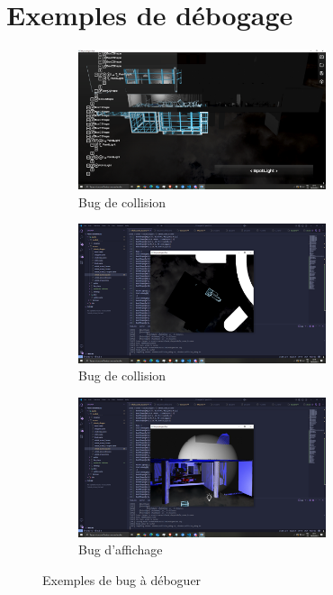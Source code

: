 \documentclass[10pt]{article}
\begin{document}
\section*{Exemples de débogage}

\begin{figure}[H]
    \begin{subfigure}{0.5\textwidth}
        \centering
        \includegraphics[width=0.8\textwidth]{images/gdb_editeur.png}
        \caption{Bug de collision}
        \label{fig:editeur1}
    \end{subfigure}
    \begin{subfigure}{0.5\textwidth}
        \centering
        \includegraphics[width=0.8\textwidth]{images/gdb_editeur2.png}
        \caption{Bug de collision}
        \label{fig:editeur2}
    \end{subfigure}
    \begin{subfigure}{0.5\textwidth}
        \centering
        \includegraphics[width=0.8\textwidth]{images/gdb_editeur3.png}
        \caption{Bug d'affichage}
        \label{fig:editeur3}
    \end{subfigure}
    \caption{Exemples de bug à déboguer}
    \label{fig:debug}
\end{figure}
\end{document}
